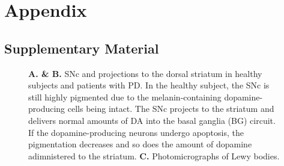 \appendix
\renewcommand{\thesection}{\Alph{section}}
\chapter*{Appendix}

\section{Supplementary Material}


   \begin{figure}[h]
      \begin{center}
      \end{center}
      \caption{
         \textbf{A. \& B.} SNc and projections to the dorsal striatum in healthy subjects and patients with PD.
         In the healthy subject, the SNc is still highly pigmented due to the melanin-containing dopamine-producing cells being intact.
         The SNc projects to the striatum and delivers normal amounts of DA into the basal ganglia (BG) circuit.
         If the dopamine-producing neurons undergo apoptosis, the pigmentation decreases and so does the amount of dopamine adimnistered to the striatum.
         \textbf{C.} Photomicrographs of Lewy bodies.
      }
      \label{broad-mech}
   \end{figure}
